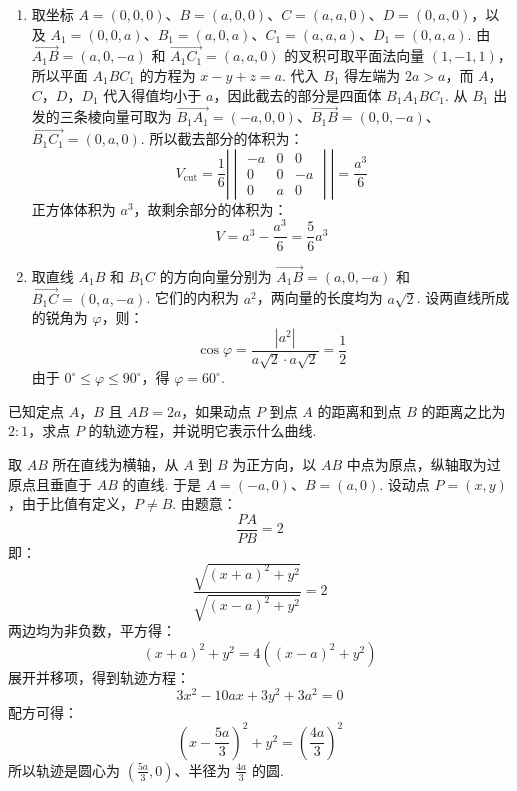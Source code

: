 \documentclass[UTF8,a4paper,oneside,11pt]{ctexbook}
\begin{document}
\begin{solution}
\begin{enumerate}
\item 取坐标 \(A=(0,0,0)\)、\(B=(a,0,0)\)、\(C=(a,a,0)\)、\(D=(0,a,0)\)，以及 \(A_1=(0,0,a)\)、\(B_1=(a,0,a)\)、\(C_1=(a,a,a)\)、\(D_1=(0,a,a)\).
由 \(\overrightarrow{A_1B}=(a,0,-a)\) 和 \(\overrightarrow{A_1C_1}=(a,a,0)\) 的叉积可取平面法向量 \((1,-1,1)\)，所以平面 \(A_1BC_1\) 的方程为 \(x-y+z=a\). 代入 \(B_1\) 得左端为 \(2a>a\)，而 \(A\)，\(C\)，\(D\)，\(D_1\) 代入得值均小于 \(a\)，因此截去的部分是四面体 \(B_1A_1BC_1\). 从 \(B_1\) 出发的三条棱向量可取为 \(\overrightarrow{B_1A_1}=(-a,0,0)\)、\(\overrightarrow{B_1B}=(0,0,-a)\)、\(\overrightarrow{B_1C_1}=(0,a,0)\).
所以截去部分的体积为：
\[
 V_{\mathrm{cut}}=\frac16\left|\begin{vmatrix}-a&0&0\\0&0&-a\\0&a&0\end{vmatrix}\right|=\frac{a^3}{6}
\]
正方体体积为 \(a^3\)，故剩余部分的体积为：
\[
 V=a^3-\frac{a^3}{6}=\frac56a^3
\]
\item 取直线 \(A_1B\) 和 \(B_1C\) 的方向向量分别为 \(\overrightarrow{A_1B}=(a,0,-a)\) 和 \(\overrightarrow{B_1C}=(0,a,-a)\).
它们的内积为 \(a^2\)，两向量的长度均为 \(a\sqrt2\). 设两直线所成的锐角为 \(\varphi\)，则：
\[
 \cos\varphi=\frac{|a^2|}{a\sqrt2\cdot a\sqrt2}=\frac12
\]
由于 \(0^\circ\leqslant\varphi\leqslant90^\circ\)，得 \(\varphi=60^\circ\).
\end{enumerate}
\end{solution}

\begin{problem}

已知定点 \(A\)，\(B\) 且 \(AB=2a\)，如果动点 \(P\) 到点 \(A\) 的距离和到点 \(B\) 的距离之比为 \(2:1\)，求点 \(P\) 的轨迹方程，并说明它表示什么曲线.
\end{problem}

\begin{solution}
取 \(AB\) 所在直线为横轴，从 \(A\) 到 \(B\) 为正方向，以 \(AB\) 中点为原点，纵轴取为过原点且垂直于 \(AB\) 的直线. 于是
\(A=(-a,0)\)、\(B=(a,0)\).
设动点 \(P=(x,y)\)，由于比值有定义，\(P\neq B\). 由题意：
\[
 \frac{PA}{PB}=2
\]
即：
\[
 \frac{\sqrt{(x+a)^2+y^2}}{\sqrt{(x-a)^2+y^2}}=2
\]
两边均为非负数，平方得：
\[
 (x+a)^2+y^2=4\left((x-a)^2+y^2\right)
\]
展开并移项，得到轨迹方程：
\[
 3x^2-10ax+3y^2+3a^2=0
\]
配方可得：
\[
 \left(x-\frac{5a}{3}\right)^2+y^2=\left(\frac{4a}{3}\right)^2
\]
所以轨迹是圆心为 \(\left(\frac{5a}{3},0\right)\)、半径为 \(\frac{4a}{3}\) 的圆.
\end{solution}
\end{document}
